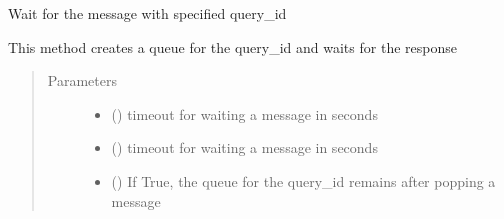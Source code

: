 \documentclass[letterpaper,10pt,english]{sphinxmanual}
\begin{document}
\begin{fulllineitems}
\begin{fulllineitems}
\begin{quote}
\begin{description}
\end{description}\end{quote}

\end{fulllineitems}


\begin{fulllineitems}
\label{\detokenize{bbc1.core.bbc_app:bbc1.core.bbc_app.Callback.set_client}}
\end{fulllineitems}


\begin{fulllineitems}
\label{\detokenize{bbc1.core.bbc_app:bbc1.core.bbc_app.Callback.set_logger}}
\end{fulllineitems}


\begin{fulllineitems}
\label{\detokenize{bbc1.core.bbc_app:bbc1.core.bbc_app.Callback.sync_by_queryid}}
Wait for the message with specified query\_id

This method creates a queue for the query\_id and waits for the response
\begin{quote}\begin{description}
\item[{Parameters}] \leavevmode\begin{itemize}
\item {} 
 () \textendash{} timeout for waiting a message in seconds

\item {} 
 () \textendash{} timeout for waiting a message in seconds

\item {} 
 () \textendash{} If True, the queue for the query\_id remains after popping a message


\end{itemize}
\end{description}
\end{quote}
\end{fulllineitems}
\end{fulllineitems}
\end{document}
